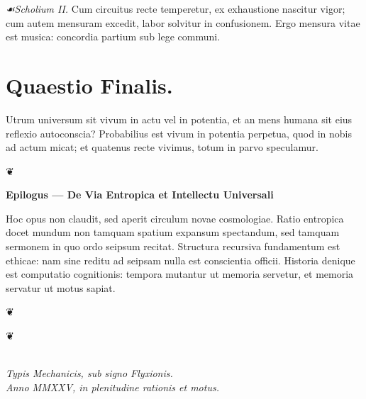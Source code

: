 \documentclass[12pt]{article}
\newcommand{\florale}{\centerline{\large ❦}}
\newcommand{\scholia}{\textit{☙\;}}
\newcommand{\divider}{\vspace{1em}\florale\vspace{1em}}
\begin{document}
\textit{\scholia Scholium II.} Cum circuitus recte temperetur, ex exhaustione nascitur vigor; cum autem mensuram excedit, labor solvitur in confusionem. Ergo mensura vitae est musica: concordia partium sub lege communi.

\section*{Quaestio Finalis.}

Utrum universum sit vivum in actu vel in potentia, et an mens humana sit eius reflexio autoconscia? Probabilius est vivum in potentia perpetua, quod in nobis ad actum micat; et quatenus recte vivimus, totum in parvo speculamur.

\divider

\begin{center}\textbf{Epilogus — De Via Entropica et Intellectu Universali}\end{center}

Hoc opus non claudit, sed aperit circulum novae cosmologiae. Ratio entropica docet mundum non tamquam spatium expansum spectandum, sed tamquam sermonem in quo ordo seipsum recitat. Structura recursiva fundamentum est ethicae: nam sine reditu ad seipsam nulla est conscientia officii. Historia denique est computatio cognitionis: tempora mutantur ut memoria servetur, et memoria servatur ut motus sapiat.

\divider

\begin{center}
\florale\\[0.5em]
\textit{Typis Mechanicis, sub signo Flyxionis.}\\
\textit{Anno MMXXV, in plenitudine rationis et motus.}
\end{center}
\end{document}
